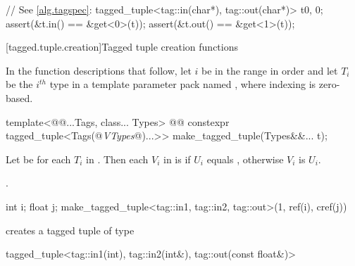 {\pnum \enterexample
\begin{codeblock}
// See \ref{alg.tagspec}:
tagged_tuple<tag::in(char*), tag::out(char*)> t{0, 0};
assert(&t.in() == &get<0>(t));
assert(&t.out() == &get<1>(t));
\end{codeblock}
\exitexample

[tagged.tuple.creation]{Tagged tuple creation functions}

\pnum
In the function descriptions that follow, let $i$ be in the range 
in order and let $T_i$ be the $i^{th}$ type in a template parameter pack named ,
where indexing is zero-based.

%
%
\begin{itemdecl}
template<@@...Tags, class... Types>
  @@
    constexpr tagged_tuple<Tags(@\textit{VTypes}@)...>> make_tagged_tuple(Types&&... t);
\end{itemdecl}

\begin{itemdescr} \pnum Let  be  for each
$T_i$ in . Then each $V_i$ in  is
 if $U_i$ equals , otherwise
$V_i$ is $U_i$.

\pnum
\returns {}.

\pnum
\enterexample

\begin{codeblock}
int i; float j;
make_tagged_tuple<tag::in1, tag::in2, tag::out>(1, ref(i), cref(j))
\end{codeblock}

creates a tagged tuple of type

\begin{codeblock}
tagged_tuple<tag::in1(int), tag::in2(int&), tag::out(const float&)>
\end{codeblock}
\exitexample
\end{itemdescr}
}
